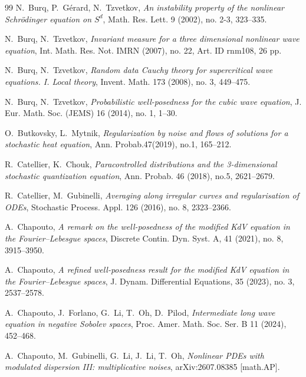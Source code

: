 \documentclass[letterpaper, 11pt,  reqno]{amsart}
\newcommand{\1}{\hspace{0.5mm}\text{I}\hspace{0.5mm}}
\numberwithin{equation}{section}
\numberwithin{theorem}{section}
\begin{document}
\begin{thebibliography}{99}
N.~Burq, P.~G\'erard, N.~Tzvetkov,
{\it  An instability property of the nonlinear Schr\"odinger equation on $S^d$},  Math. Res. Lett. 9 (2002), no. 2-3, 323--335.

N.~Burq, N.~Tzvetkov, 
{\it Invariant measure for a three dimensional nonlinear wave equation},
 Int. Math. Res. Not. IMRN (2007), no. 22, Art. ID rnm108, 26 pp.


N.~Burq, N.~Tzvetkov, 
{\it Random data Cauchy theory for supercritical wave equations. I. Local theory},
 Invent. Math. 173 (2008), no. 3, 449--475. 


N.~Burq, N.~Tzvetkov, 
{\it Probabilistic well-posedness for the cubic wave equation},
 J. Eur. Math. Soc. (JEMS) 16 (2014), no. 1, 1--30. 
 
 

O.~Butkovsky, L.~Mytnik, 
{\it Regularization by noise and flows of solutions for a stochastic heat equation},
Ann. Probab.47(2019), no.1, 165--212.


R.~Catellier, K.~Chouk,
{\it Paracontrolled distributions and the 3-dimensional stochastic quantization equation},
Ann. Probab. 46 (2018), no.5, 2621--2679.





R.~Catellier, M.~Gubinelli, 
{\it Averaging along irregular curves and regularisation of ODEs}, 
Stochastic Process. Appl. 126 (2016), no. 8, 2323--2366. 



A.~Chapouto, 
{\it A remark on the well-posedness of the modified KdV equation in the Fourier--Lebesgue spaces}, Discrete Contin. Dyn. Syst. A, 41 (2021), no. 8, 3915--3950.

A.~Chapouto, 
{\it  A refined well-posedness result for the modified KdV equation in the Fourier--Lebesgue spaces}, 
 J. Dynam. Differential Equations, 35 (2023), no. 3, 2537--2578.



A.~Chapouto, J.~Forlano, G.~Li, T.~Oh, D.~Pilod,
{\it  Intermediate long wave equation in negative Sobolev spaces},
 Proc. Amer. Math. Soc. Ser. B 11 (2024), 452--468.



A.~Chapouto, M.~Gubinelli, G.~Li, J.~Li, T.~Oh, 
{\it Nonlinear PDEs with modulated dispersion III: multiplicative noises}, 
arXiv:2607.08385 [math.AP].



\end{thebibliography}
\end{document}
